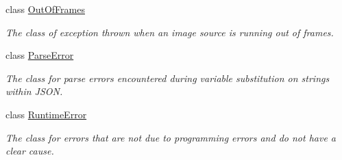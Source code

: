 \begin{DoxyCompactItemize}
class \hyperlink{classstereo__ugv_1_1OutOfFrames}{Out\+Of\+Frames}
\begin{DoxyCompactList}\small\item\em The class of exception thrown when an image source is running out of frames. \end{DoxyCompactList}\item 
class \hyperlink{classstereo__ugv_1_1ParseError}{Parse\+Error}
\begin{DoxyCompactList}\small\item\em The class for parse errors encountered during variable substitution on strings within J\+S\+ON. \end{DoxyCompactList}\item 
class \hyperlink{classstereo__ugv_1_1RuntimeError}{Runtime\+Error}
\begin{DoxyCompactList}\small\item\em The class for errors that are not due to programming errors and do not have a clear cause. \end{DoxyCompactList}\end{DoxyCompactItemize}
